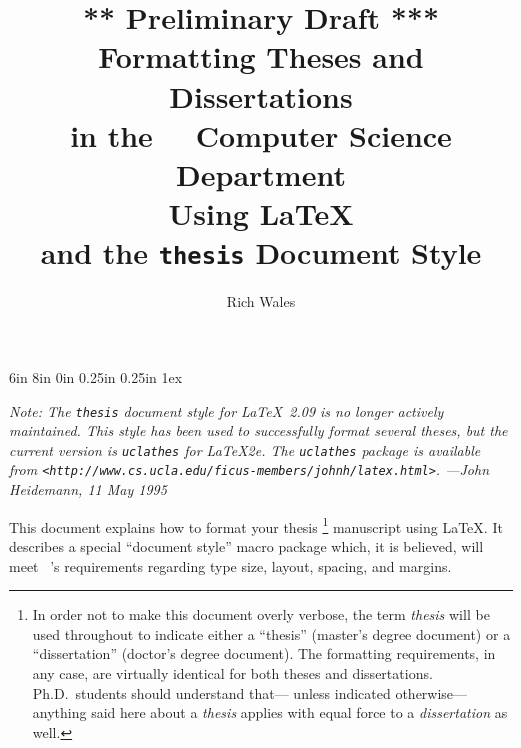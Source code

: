 \batchmode
{}

\setlength {\textwidth} {6in}
\setlength {\textheight} {8in}
\setlength {\topmargin} {0in}
\setlength {\oddsidemargin} {0.25in}
\setlength {\evensidemargin} {0.25in}
\addtolength {\parskip} {1ex}

\newcommand {\caps}[1] {\mbox {\ifnum\fam=0 \sc\else\uppercase\fi{#1}}}

\newcommand {\tdadvisor} {Theses and Dissertations Advisor}
\newcommand {\csd} {Computer Science Department}
\newcommand {\eg} {{\em e.g.}}
\newcommand {\ie} {{\em i.e.}}
\newcommand {\later} {\noindent{\em(*** more to be written later ***)}}
\newcommand {\regs} {{\sl Regulations for Thesis
		      and Dissertation Preparation}}
\newcommand {\ucla} {\caps {ucla}}
\newcommand {\uclacsd} {\ucla\ \csd}
\newcommand {\umi} {\caps {umi}}

\title	{{\large \sc *** Preliminary Draft ***} \\
	 Formatting Theses and Dissertations \\
	 in the \uclacsd \\ Using \LaTeX \\
	 and the {\tt thesis} Document Style}
\author {Rich Wales}
\date{}

\maketitle

{\slshape
Note:  The \verb|thesis| document style for \LaTeX\ 2.09
  is no longer actively maintained.
This style has been used to successfully format several
  theses,
  but the current version is \verb|uclathes| for \LaTeX 2e.
The \verb|uclathes| package is available from
  \verb|<http://www.cs.ucla.edu/ficus-members/johnh/latex.html>|.
  ---John Heidemann, 11 May 1995}


This document explains how to format your thesis%
\footnote {In order not to make this document overly verbose,
the term {\em thesis\/} will be used throughout
to indicate either a ``thesis'' (master's degree document)
or a ``dissertation'' (doctor's degree document).
The formatting requirements, in any case,
are virtually identical for both theses and dissertations.
Ph.D.\ students should understand that---%
unless indicated otherwise---%
anything said here about a {\em thesis\/}
applies with equal force to a {\em dissertation\/} as well.}
manuscript using \LaTeX.
It describes a special ``document style'' macro package
which, it is believed, will meet \ucla's requirements
regarding type size, layout, spacing, and margins.

